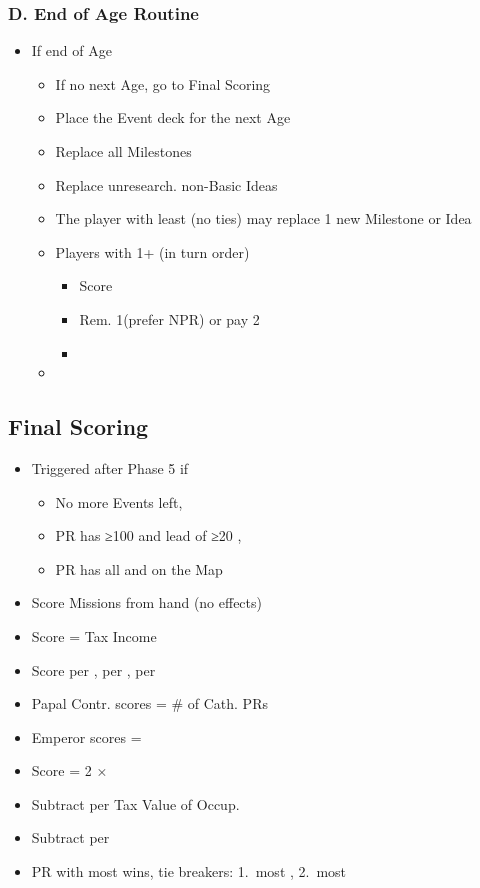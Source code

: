 \documentclass[10pt]{article}
\begin{document}
\subsubsection*{D. End of Age Routine}
\begin{itemize}
	\item If end of Age
	\begin{itemize}
		\item If no next Age, go to Final Scoring
		\item Place the Event deck for the next Age
		\item Replace all Milestones
		\item Replace unresearch. non-Basic Ideas
		\item The player with least \prestige (no ties) may replace 1 new Milestone or Idea
		\item Players with 1+ \marriage (in turn order)
		\begin{itemize}
			\item Score 
			\item Rem. 1\marriage (prefer NPR) or pay 2\diplopower
			\item {}
		\end{itemize}
		\item {}
	\end{itemize}
\end{itemize}

\subsection*{Final Scoring}
\begin{itemize}
	\item Triggered after Phase 5 if
	\begin{itemize}
		\item No more Events left, 
		\item PR has ≥100 \prestige and lead of ≥20 \prestige, 
		\item PR has all \towns and \vassals on the Map
	\end{itemize}
	\item Score Missions from hand (no effects)
	\item Score \prestige = Tax Income
	\item Score  per \core,  per \marriage,  per \alliance
	\item Papal Contr. scores \prestige = \# of Cath. PRs
	\item Emperor scores \prestige = \authority
	\item Score \prestige = 2 × \stability
	\item Subtract  per Tax Value of Occup. \towns
	\item Subtract  per \interest
	\item PR with most \prestige wins, tie breakers: 1.~most \monarchpower, 2.~most \ducats%
\end{itemize}
\end{document}
